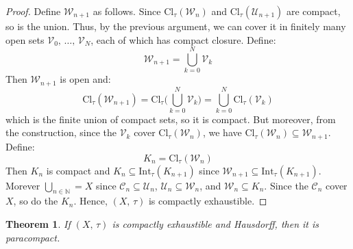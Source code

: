 \documentclass{article}
\theoremstyle{plain}
\newtheorem{theorem}{Theorem}[section]
\theoremstyle{normal}
\begin{document}
\begin{proof}
            Define $\mathcal{W}_{n+1}$ as follows. Since
            $\textrm{Cl}_{\tau}(\mathcal{W}_{n})$ and
            $\textrm{Cl}_{\tau}(\mathcal{U}_{n+1})$ are compact, so is the
            union. Thus, by the previous argument, we can cover it in finitely
            many open sets $\mathcal{V}_{0},\,\dots,\,\mathcal{V}_{N}$, each
            of which has compact closure. Define:
            \begin{equation}
                \mathcal{W}_{n+1}=\bigcup_{k=0}^{N}\mathcal{V}_{k}
            \end{equation}
            Then $\mathcal{W}_{n+1}$ is open and:
            \begin{equation}
                \textrm{Cl}_{\tau}(\mathcal{W}_{n+1})
                =\textrm{Cl}_{\tau}\Big(\bigcup_{k=0}^{N}\mathcal{V}_{k}\Big)
                =\bigcup_{k=0}^{N}\textrm{Cl}_{\tau}(\mathcal{V}_{k})
            \end{equation}
            which is the finite union of compact sets, so it is compact.
            But moreover, from the construction, since the $\mathcal{V}_{k}$
            cover $\textrm{Cl}_{\tau}(\mathcal{W}_{n})$, we have
            $\textrm{Cl}_{\tau}(\mathcal{W}_{n})\subseteq\mathcal{W}_{n+1}$.
            Define:
            \begin{equation}
                K_{n}=\textrm{Cl}_{\tau}(\mathcal{W}_{n})
            \end{equation}
            Then $K_{n}$ is compact and
            $K_{n}\subseteq\textrm{Int}_{\tau}(K_{n+1})$ since
            $\mathcal{W}_{n+1}\subseteq\textrm{Int}_{\tau}(K_{n+1})$. Morever
            $\bigcup_{n\in\mathbb{N}}=X$ since
            $\mathcal{C}_{n}\subseteq\mathcal{U}_{n}$,
            $\mathcal{U}_{n}\subseteq\mathcal{W}_{n}$, and
            $\mathcal{W}_{n}\subseteq{K}_{n}$. Since the $\mathcal{C}_{n}$
            cover $X$, so do the $K_{n}$. Hence, $(X,\,\tau)$ is
            compactly exhaustible.
        \end{proof}
        \begin{theorem}
            If $(X,\,\tau)$ is compactly exhaustible and Hausdorff,
            then it is paracompact.
        \end{theorem}
\end{document}

